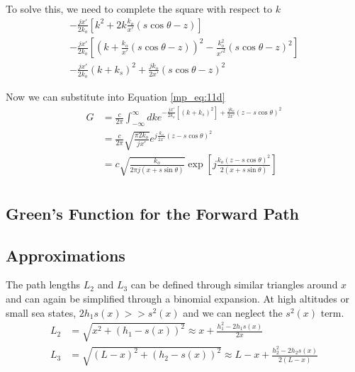 To solve this, we need to complete the square with respect to $k$
\begin{equation}
\begin{gathered}
-\frac{jx'}{2k_o}\left[k^2  +2k\frac{k_o}{x'}(s\cos\theta -z)\right]\\
-\frac{jx'}{2k_o}\left[\left(k  +\frac{k_o}{x'}(s\cos\theta -z)\right)^2 - \frac{k_o^2}{x'^2}(s\cos\theta - z)^2 \right]\\
-\frac{jx'}{2k_o}\left(k  +k_s\right)^2+ \frac{jk_o}{2x'}(s\cos\theta - z)^2 
\end{gathered}
\label{mp_eq:11e}
\end{equation}

Now we can substitute into Equation \ref{mp_eq:11d}
\begin{equation}
\begin{aligned}
G &= \frac{c}{2\pi}\int_{-\infty}^{\infty}dk e^{-\frac{jx'}{2k_o}\left[\left(k  +k_s\right)^2\right]+ \frac{jk_o}{2x'}(z-s\cos\theta)^2 } \\
&= \frac{c}{2\pi} \sqrt{\frac{\pi 2k_o}{jx'}}e^{j\frac{k_o}{2x'}(z-s\cos\theta)^2 } \\
&= c\sqrt{\frac{k_o}{2\pi j(x+s\sin\theta)}}\exp\left[j\frac{k_o(z-s\cos\theta)^2}{2(x+s\sin\theta)} \right]\\
\end{aligned}
\label{mp_eq:11f}
\end{equation}

\subsection{Green's Function for the Forward Path}

\subsection{Approximations}

The path lengths  $L_2$ and $L_3$ can be defined through similar triangles around $x$ and can again be simplified through a binomial expansion. At high altitudes or small sea states, $2h_1s(x) >> s^2(x)$ and we can neglect the $s^2(x)$ term.
\begin{equation}
\begin{aligned}
L_2 &= \sqrt{x^2 + \left( h_1 - s(x)\right)^2}  \approx x + \frac{h_1^2-2h_1s(x)}{2x}\\
L_3 & = \sqrt{\left(L - x\right)^2 + \left( h_2 - s(x)\right)^2}  \approx L-x + \frac{h_2^2 - 2h_2s(x)}{2\left(L-x\right)}\\
\end{aligned}
\label{mp_eq:12}
\end{equation}
\renewcommand{\baselinestretch}{2} \small\normalsize


